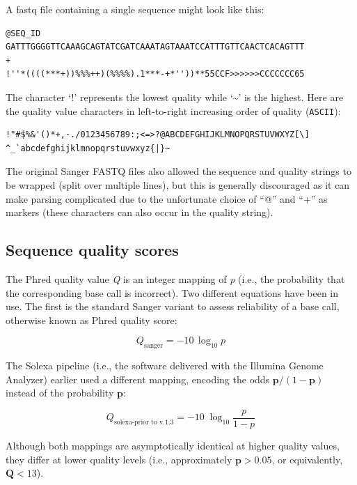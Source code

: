 \documentclass[
  letterpaper,
  DIV=11,
  numbers=noendperiod]{scrreprt}
\begin{document}
A fastq file containing a single sequence might look like this:

\begin{verbatim}
@SEQ_ID
GATTTGGGGTTCAAAGCAGTATCGATCAAATAGTAAATCCATTTGTTCAACTCACAGTTT
+
!''*((((***+))%%%++)(%%%%).1***-+*''))**55CCF>>>>>>CCCCCCC65
\end{verbatim}

The character `!' represents the lowest quality while
`\textasciitilde{}' is the highest. Here are the quality value
characters in left-to-right increasing order of quality
(\texttt{ASCII}):

\begin{verbatim}
!"#$%&'()*+,-./0123456789:;<=>?@ABCDEFGHIJKLMNOPQRSTUVWXYZ[\]
^_`abcdefghijklmnopqrstuvwxyz{|}~
\end{verbatim}

The original Sanger FASTQ files also allowed the sequence and quality
strings to be wrapped (split over multiple lines), but this is generally
discouraged as it can make parsing complicated due to the unfortunate
choice of ``@'' and ``+'' as markers (these characters can also occur in
the quality string).

\hypertarget{sequence-quality-scores}{%
\subsection*{Sequence quality scores}\label{sequence-quality-scores}}

The Phred quality value \emph{Q} is an integer mapping of \emph{p}
(i.e., the probability that the corresponding base call is incorrect).
Two different equations have been in use. The first is the standard
Sanger variant to assess reliability of a base call, otherwise known as
Phred quality score:

\[
Q_\text{sanger} = -10 \, \log_{10} p
\]

The Solexa pipeline (i.e., the software delivered with the Illumina
Genome Analyzer) earlier used a different mapping, encoding the odds
\(\mathbf{p}/(1-\mathbf{p})\) instead of the probability \(\mathbf{p}\):

\[
Q_\text{solexa-prior to v.1.3} = -10 \; \log_{10} \frac{p}{1-p}
\]

Although both mappings are asymptotically identical at higher quality
values, they differ at lower quality levels (i.e., approximately
\(\mathbf{p} > 0.05\), or equivalently, \(\mathbf{Q} < 13\)).
\end{document}
